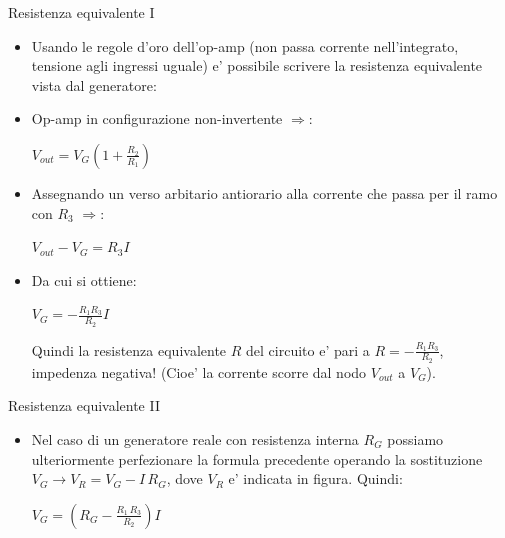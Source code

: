 \documentclass{beamer}
\begin{document}
\begin{frame}{Resistenza equivalente I}
\begin{itemize}
\item Usando le regole d'oro dell'op-amp (non passa corrente nell'integrato, tensione agli ingressi uguale) e' possibile scrivere la resistenza equivalente vista dal generatore:

\item Op-amp in configurazione non-invertente $\Rightarrow$:

\begin{definition}
$V_{out} = V_G (1+\frac{R_2}{R_1})$
\end{definition}

\item Assegnando un verso arbitario antiorario alla corrente che passa per il ramo con $R_3$ $\Rightarrow$:

\begin{definition}
$V_{out} - V_G = R_3 I$
\end{definition}
\end{itemize}
\end{frame}

\begin{frame}
\begin{itemize}

\item Da cui si ottiene:

\begin{theorem}
$V_G = -\frac{R_1 R_3}{R_2}I$
\end{theorem}

Quindi la resistenza equivalente $R$ del circuito e' pari a $R = -\frac{R_1 R_3}{R_2}$, impedenza negativa! (Cioe' la corrente scorre dal nodo $V_{out}$ a $V_G$).
\end{itemize}
\end{frame}

\begin{frame}{Resistenza equivalente II}
\begin{itemize}

\item Nel caso di un generatore reale con resistenza interna $R_G$ possiamo ulteriormente perfezionare la formula precedente operando la sostituzione $V_G \rightarrow V_R = V_G - I\,R_G $, dove $V_R$ e' indicata in figura. Quindi:

\begin{theorem}
$V_G = (R_G - \frac{R_1\, R_3}{R_2})I$
\end{theorem}
\end{itemize}
\end{frame}
\end{document}
